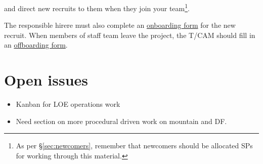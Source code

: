 
and direct new recruits to them when they join your team\footnote{As per \S\ref{sec:newcomers}, remember that newcomers should be allocated \glspl{SP} for working through this material.}.

The responsible hirere must also complete an \href{https://project.lsst.org/onboarding/form}{onboarding form} for the new recruit.
When members of staff team leave the project, the \gls{T/CAM} should fill in an \href{https://project.lsst.org/onboarding/offboarding_form}{offboarding form}.


\section{Open issues}

\begin{itemize}
\item Kanban for \gls{LOE} operations work
\item Need section on more procedural driven work on mountain and DF.
\end{itemize}


